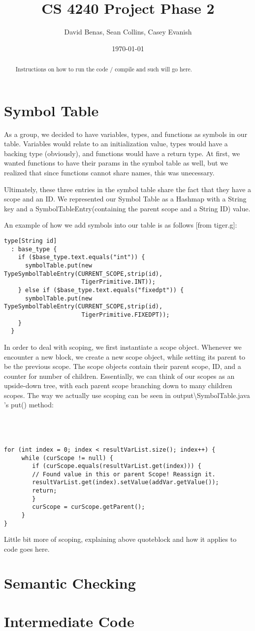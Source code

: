 \documentclass[a4paper]{article}
\title{CS 4240 Project Phase 2}
\author{David Benas, Sean Collins, Casey Evanish}
\date{\today}
\begin{document}
\maketitle

\begin{abstract}
Instructions on how to run the code / compile and such will go here.
\end{abstract}

\section{Symbol Table}
	As a group, we decided to have variables, types, and functions as symbols in our table. Variables would relate to an initialization value, types would have a backing type (obviously), and functions would have a return type. At first, we wanted functions to have their params in the symbol table as well, but we realized that since functions cannot share names, this was unecessary. 

Ultimately, these three entries in the symbol table share the fact that they have a scope and an ID. We represented our Symbol Table as a Hashmap with a String key and a SymbolTableEntry(containing the parent scope and a String ID) value.

An example of how we add symbols into our table is as follows [from tiger.g]:
\begin{verbatim}
type[String id]	
  :	base_type {
    if ($base_type.text.equals("int")) { 
      symbolTable.put(new TypeSymbolTableEntry(CURRENT_SCOPE,strip(id), 
      				  TigerPrimitive.INT));
    } else if ($base_type.text.equals("fixedpt")) {
      symbolTable.put(new TypeSymbolTableEntry(CURRENT_SCOPE,strip(id), 
      				  TigerPrimitive.FIXEDPT));
    }
  }
\end{verbatim}

In order to deal with scoping, we first instantiate a scope object. Whenever we encounter a new block, we create a new scope object, while setting its parent to be the previous scope. The scope objects contain their parent scope, ID, and a counter for number of children. Essentially, we can think of our scopes as an upside-down tree, with each parent scope branching down to many children scopes. The way we actually use scoping can be seen in output\textbackslash SymbolTable.java 's put() method: \\ \\ \\ \\
\begin{verbatim}
for (int index = 0; index < resultVarList.size(); index++) {
     while (curScope != null) {
        if (curScope.equals(resultVarList.get(index))) {
        // Found value in this or parent Scope! Reassign it.
        resultVarList.get(index).setValue(addVar.getValue());
        return;
        }						
        curScope = curScope.getParent();
     }					
}
\end{verbatim}
Little bit more of scoping, explaining above quoteblock and how it applies to code goes here.
\section{Semantic Checking}

\section{Intermediate Code}
\end{document}
